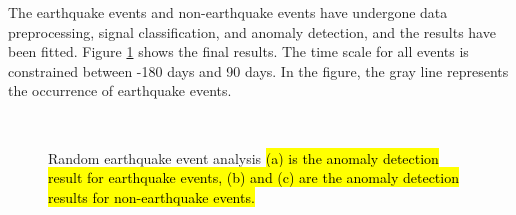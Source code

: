 \documentclass[3p,authoryear,preprint,12pt]{elsarticle}
\begin{document}
The earthquake events and non-earthquake events have undergone data preprocessing, signal classification, and anomaly detection, and the results have been fitted. Figure \ref{fig:random earthquake event analysis} shows the final results. The time scale for all events is constrained between -180 days and 90 days. In the figure, the gray line represents the occurrence of earthquake events.
\begin{figure}[htbp]
	\centering
	 \\
	\caption{Random earthquake event analysis \hl{(a) is the anomaly detection result for earthquake events, (b) and (c) are the anomaly detection results for non-earthquake events.}}
	\label{fig:random earthquake event analysis}
\end{figure}
\end{document}
